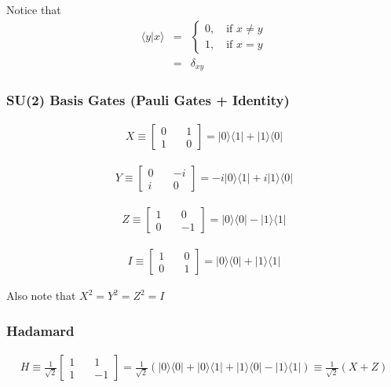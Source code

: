 \documentclass[preprint,aps,prd,nofootinbib,superscriptaddress]{revtex4-2}
\begin{document}
Notice that 
\begin{eqnarray} \label{eqn:outer_prods}
\langle y|x \rangle &=& \left\lbrace 
\begin{matrix}
0, \quad \text{if } x\neq y \\ 
1, \quad \text{if } x= y
\end{matrix}
\right.
\nonumber \\
&=& \delta_{xy}
\end{eqnarray}


\subsubsection{SU(2) Basis Gates (Pauli Gates + Identity)}

%
\begin{eqnarray}
X \equiv 
\begin{bmatrix} 0 \quad & 1\\ 
1 \quad & 0 
\end{bmatrix} 
= |0 \rangle \langle 1| + |1 \rangle \langle 0|
\end{eqnarray}

%
\begin{eqnarray}
Y \equiv 
\begin{bmatrix} 0 \quad & -i\\ 
i \quad & 0 
\end{bmatrix} 
= -i|0 \rangle \langle 1| + i|1 \rangle \langle 0|
\end{eqnarray}

%
\begin{eqnarray}
Z \equiv 
\begin{bmatrix} 1 \quad & 0\\ 
0 \quad & -1 
\end{bmatrix}
= |0 \rangle \langle 0| - |1 \rangle \langle 1|
\end{eqnarray}

%
\begin{eqnarray}
I \equiv 
\begin{bmatrix} 1 \quad & 0\\ 
0 \quad & 1 
\end{bmatrix} 
= |0 \rangle \langle 0| + |1 \rangle \langle 1|
\end{eqnarray}

Also note that $X^2 = Y^2 = Z^2 = I$

\subsubsection{Hadamard}
%
\begin{eqnarray}
H \equiv \frac{1}{\sqrt{2}}
\begin{bmatrix} 1 \quad & 1 \\ 
1 \quad & -1 
\end{bmatrix} 
= \frac{1}{\sqrt{2}} \left(|0 \rangle \langle 0| + |0 \rangle \langle 1| + |1 \rangle \langle 0| - |1 \rangle \langle 1|\right) \equiv  \frac{1}{\sqrt{2}} \left(X + Z\right)
\end{eqnarray}
\end{document}
